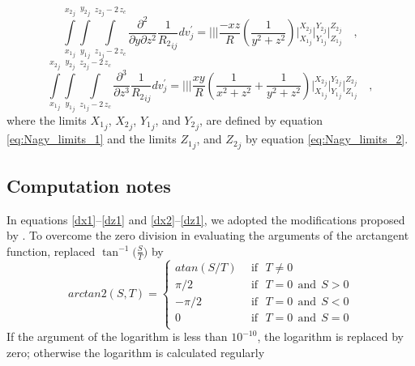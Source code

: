\documentclass[journal abbreviation, manuscript]{copernicus}
\begin{document}
\begin{equation}
\int\limits_{{x_{1}}_{j}}^{{x_{2}}_{j}} \int\limits_{{y_{1}}_{j}}^{{y_{2}}_{j}} \int\limits_{{z_{1}}_{j} - 2 \, z_c}^{{z_{2}}_{j} - 2 \, z_c}
\frac{\partial^{2}  }{\partial y \partial z^{2}} {\frac{1}{{R_2}_{ij}}} dv_{j}^{\prime} =
\Bigg|\Bigg|\Bigg|
\frac{- x z}{R} 
\left( \frac{1}{y^{2} + z^{2}} \right)
\Bigg|_{{X_1}_{j}}^{{X_2}_{j}} \Bigg|_{{Y_1}_{j}}^{{Y_2}_{j}} \Bigg|_{{Z_1}_{j}}^{{Z_2}_{j}} \quad ,
\label{syzz}
\end{equation}
\begin{equation}
\int\limits_{{x_{1}}_{j}}^{{x_{2}}_{j}} \int\limits_{{y_{1}}_{j}}^{{y_{2}}_{j}} \int\limits_{{z_{1}}_{j} - 2 \, z_c}^{{z_{2}}_{j} - 2 \, z_c}
\frac{\partial^{3}  }{\partial z^{3}} {\frac{1}{{R_2}_{ij}}} dv_{j}^{\prime} =
\Bigg|\Bigg|\Bigg|
\frac{ x y}{R} 
\left( \frac{1}{x^{2} + z^{2}} + \frac{1}{y^{2} + z^{2}} \right)
\Bigg|_{{X_1}_{j}}^{{X_2}_{j}} \Bigg|_{{Y_1}_{j}}^{{Y_2}_{j}} \Bigg|_{{Z_1}_{j}}^{{Z_2}_{j}} \quad ,
\label{sz3}
\end{equation}
where the limits ${X_1}_{j}$, ${X_2}_{j}$, ${Y_1}_{j}$, and ${Y_2}_{j}$, are defined 
by equation \ref{eq:Nagy_limits_1} and the limits ${Z_1}_{j}$, and ${Z_2}_{j}$ by
equation \ref{eq:Nagy_limits_2}.

\subsection{Computation notes}

In equations \ref{dx1}--\ref{dz1} and \ref{dx2}--\ref{dz1}, we adopted the modifications proposed by \cite{Fukushima2020}.
To overcome the zero division in evaluating the arguments of the arctangent function, \cite{Fukushima2020} replaced  $\tan^{-1} \big( \frac{S}{T} \big)$ by 
\begin{equation}
arctan2(S,T) = \begin{cases}
    atan (S/T) & \:\: \mbox{if} \: \:\:  T \neq 0 \\
    \pi /2 & \:\: \mbox{if} \: \:\:  T = 0  \: \: \mbox{and} \: \:S > 0 \\
    -\pi /2 & \:\: \mbox{if} \: \:\:  T = 0  \: \: \mbox{and} \: \:S < 0 \\
    0 & \:\: \mbox{if} \: \:\:  T = 0  \: \: \mbox{and} \: \:S = 0 \\
    \end{cases}
\label{eq:arctan2}  
\end{equation}
If the argument of the logarithm is less than $10^{-10}$, the logarithm is replaced by zero; otherwise the logarithm is  calculated regularly
\end{document}
